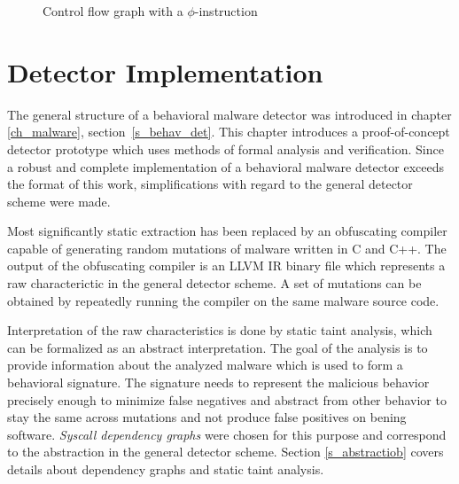 \begin{figure}[H]
    \centering
    \caption{Control flow graph with a $\phi$-instruction}
    \label{fig_cfg_phi}
\end{figure}

\chapter{Detector Implementation}
\label{ch_detector}
The general structure of a behavioral malware detector was introduced in chapter \ref{ch_malware}, section~\ref{s_behav_det}. This chapter introduces a proof-of-concept detector prototype which uses methods of formal analysis and verification. Since a robust and complete implementation of a behavioral malware detector exceeds the format of this work, simplifications with regard to the general detector scheme were made.

Most significantly static extraction has been replaced by an obfuscating compiler\cite{ollvm} capable of generating random mutations of malware written in C and C++. The output of the obfuscating compiler is an {LLVM IR} binary file which represents a raw characterictic in the general detector scheme. A set of mutations can be obtained by repeatedly running the compiler on the same malware source code.

Interpretation of the raw characteristics is done by static taint analysis, which can be formalized as an abstract interpretation. The goal of the analysis is to provide information about the analyzed malware which is used to form a behavioral signature. The signature needs to represent the malicious behavior precisely enough to minimize false negatives and abstract from other behavior to stay the same across mutations and not produce false positives on bening software. \emph{Syscall dependency graphs} were chosen for this purpose and correspond to the abstraction in the general detector scheme. Section \ref{s_abstractiob} covers details about dependency graphs and static taint analysis.

